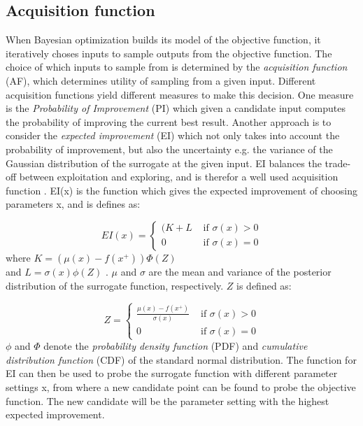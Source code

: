 \subsection{Acquisition function}
When Bayesian optimization builds its model of the objective function, it iteratively choses inputs to sample outputs from the objective function. The choice of which inputs to sample from is determined by the \emph{acquisition function} (AF), which determines utility of sampling from a given input. Different acquisition functions yield different measures to make this decision. One measure is the \emph{Probability of Improvement} (PI) which given a candidate input computes the probability of improving the current best result.  Another approach is to consider the \emph{expected improvement} (EI) which not only takes into account the probability of improvement, but also the uncertainty e.g. the variance of the Gaussian distribution of the surrogate at the given input.
EI balances the trade-off between exploitation and exploring, and is therefor a well used acquisition function \citet{brochu2010tutorial}. EI(x) is the function which gives the expected improvement of choosing parameters x, and is defines as:

\begin{equation}
\label{eq:expected-improvement}
EI(x) =
\begin{cases}
   (K + L & \text{ if } \sigma(x) > 0\\
   0 	  & \text{ if } \sigma(x) = 0
\end{cases}
\end{equation}
where $K = (\mu(x) - f(x^+))\Phi(Z)$ \\and $L = \sigma(x)\phi(Z)$ .
$\mu$ and $\sigma$ are the mean and variance of the posterior distribution of the surrogate function, respectively. $Z$ is defined as:

\begin{equation}
\label{eq:expect-z}
Z =
\begin{cases}
\frac{\mu(x) - f(x^+)}{\sigma(x)} & \text{ if } \sigma(x) > 0\\
0 								  & \text{ if } \sigma(x) = 0
\end{cases}
\end{equation}
$\phi$ and $\Phi$ denote the \emph{probability density function} (PDF) and \emph{cumulative distribution function} (CDF) of the standard normal distribution.
The function for EI can then be used to probe the surrogate function with different parameter settings x, from where a new candidate point can be found to probe the objective function. The new candidate will be the parameter setting with the highest expected improvement.  



